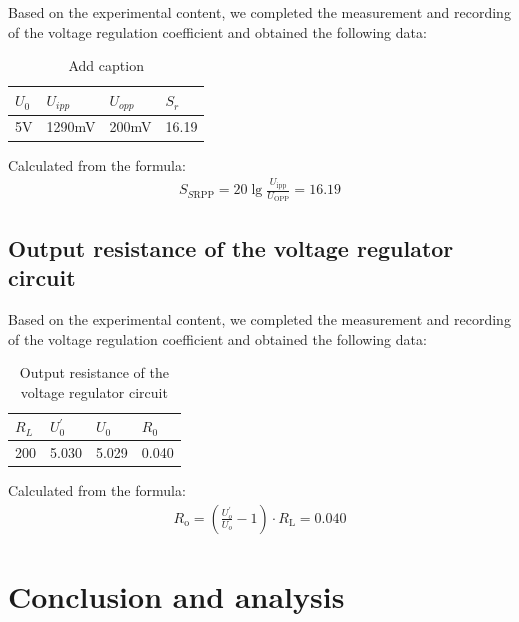 \documentclass[UTF8]{article}
\begin{document}
    Based on the experimental content, we completed the measurement and recording of the voltage regulation coefficient and obtained the following data:
    
  \begin{table}[htbp]
    \centering
    \caption{Add caption}
      \begin{tabular}{lllr}
      \toprule[2pt]
      $U_0$  & $U_{ipp}$ & $U_{opp}$ & \multicolumn{1}{l}{$S_r$} \\
      \midrule
      5V   & 1290mV & 200mV  & 16.19 \\
      \bottomrule[2pt]
      \end{tabular}%
    \label{tab:addlabel}%
  \end{table}%
    
   Calculated from the formula:
       \begin{eqnarray}
       S_{S \mathrm{RPP}}=20 \lg \frac{U_{\mathrm{ipp}}}{U_{\mathrm{OPP}}} =  16.19
       \end{eqnarray}
       
   \subsection{Output resistance of the voltage regulator circuit}
   Based on the experimental content, we completed the measurement and recording of the voltage regulation coefficient and obtained the following data:
   
   \begin{table}[htbp]
     \centering
     \caption{Output resistance of the voltage regulator circuit}
       \begin{tabular}{rrrr}
        \toprule[2pt]
       \multicolumn{1}{l}{$R_L$} & \multicolumn{1}{l}{$U_{0}^{'}$} & \multicolumn{1}{l}{$U_0$} & \multicolumn{1}{l}{$R_0$} \\
       \midrule
       200  & 5.030  & 5.029 & 0.040 \\
        \bottomrule[2pt]
       \end{tabular}%
     \label{tab:addlabel3}%
   \end{table}%
   
   Calculated from the formula:
    \begin{eqnarray}
      R_{\mathrm{o}}=\left(\frac{U_{o}^{\prime}}{U_{o}}-1\right) \cdot R_{\mathrm{L}} = 0.040
      \end{eqnarray}


\section{Conclusion and analysis}
\end{document}
